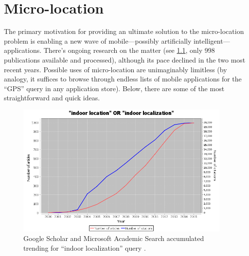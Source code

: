 \chapter{Micro-location}
\label{cha:microlocation}


The primary motivation for providing an ultimate solution to the micro-location problem is enabling a new wave of mobile---possibly artificially intelligent---applications. There's ongoing research on the matter (see \cref{fig:scholar-indoor}, only 998 publications available and processed), although its pace declined in the two most recent years. Possible uses of micro-location are unimaginably limitless (by analogy, it suffices to browse through endless lists of mobile applications for the ``GPS'' query in any application store). Below, there are some of the most straightforward and quick ideas.

\begin{figure}
	\centering
	\includegraphics[width=0.95\textwidth]{scholar-indoor}
	\caption{Google Scholar and Microsoft Academic Search accumulated trending for ``indoor localization'' query \cite{Rus:scholar-trends}.}
	\label{fig:scholar-indoor}
\end{figure}

